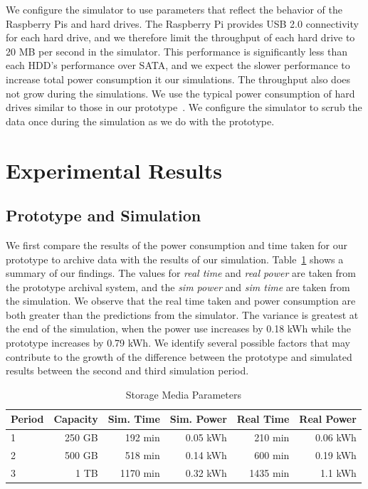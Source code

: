 We configure the simulator to use parameters that reflect the behavior of the Raspberry Pis and hard drives.  The Raspberry Pi provides USB 2.0 connectivity for each hard drive, and we therefore limit the throughput of each hard drive to 20 MB per second in the simulator.  This performance is significantly less than each HDD’s performance over SATA, and we expect the slower performance to increase total power consumption it our simulations.  The throughput also does not grow during the simulations.  We use the typical power consumption of hard drives similar to those in our prototype~\cite{web50,web38}.  We configure the simulator to scrub the data once during the simulation as we do with the prototype.

\section{Experimental Results}

\subsection{Prototype and Simulation}
We first compare the results of the power consumption and time taken for our prototype to archive data with the results of our simulation.  Table~\ref{tab:comp} shows a summary of our findings.  The values for \textit{real time} and \textit{real power} are taken from the prototype archival system, and the \textit{sim power} and \textit{sim time} are taken from the simulation.  We observe that the real time taken and power consumption are both greater than the predictions from the simulator.  The variance is greatest at the end of the simulation, when the power use increases by 0.18 kWh while the prototype increases by 0.79 kWh.  We identify several possible factors that may contribute to the growth of the difference between the prototype and simulated results between the second and third simulation period.

\begin{table}[!hbt]
\begin{minipage}{\linewidth}
\centering
  \caption{Storage Media Parameters}
  \label{tab:comp}
  \begin{tabular}{lr|rr|rr}
    \toprule
    \textbf{Period}&\textbf{Capacity}&\textbf{Sim. Time}&\textbf{Sim. Power}&\textbf{Real Time}&\textbf{Real Power}\\
    \midrule
    1&250 GB&192 min&0.05 kWh&210 min&0.06 kWh\\
    2&500 GB&518 min&0.14 kWh&600 min&0.19 kWh\\
    3&1 TB&1170 min&0.32 kWh&1435 min&1.1 kWh\\
  \bottomrule
\end{tabular}
\end{minipage}
\end{table}

